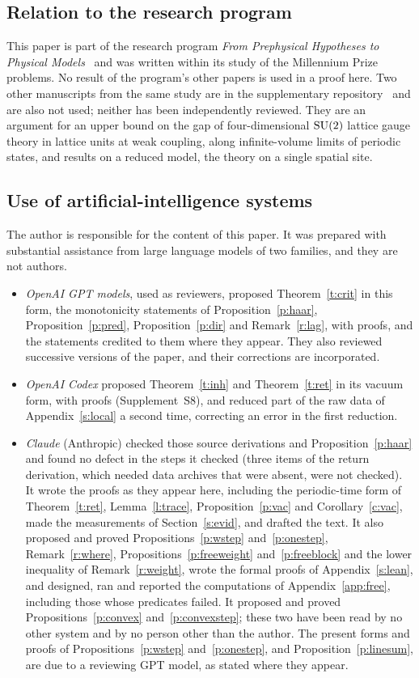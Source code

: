 \subsection*{Relation to the research program}
This paper is part of the research program \emph{From Prephysical Hypotheses to Physical
Models}~\cite{Prog} and was written within its study of the Millennium Prize problems. No result of the
program's other papers is used in a proof here. Two other manuscripts from the same study are in the
supplementary repository~\cite{Supp} and are also not used; neither has been independently reviewed. They
are an argument for an upper bound on the gap of four-dimensional $\mathrm{SU}(2)$ lattice gauge theory in lattice
units at weak coupling, along infinite-volume limits of periodic states, and results on a reduced model, the
theory on a single spatial site.

\subsection*{Use of artificial-intelligence systems}
The author is responsible for the content of this paper. It was prepared with substantial assistance from
large language models of two families, and they are not authors.
\begin{itemize}
\item \emph{OpenAI GPT models}, used as reviewers, proposed Theorem~\ref{t:crit} in this form, the
monotonicity statements of Proposition~\ref{p:haar}, Proposition~\ref{p:pred}, Proposition~\ref{p:dir} and
Remark~\ref{r:lag}, with proofs, and the statements credited to them where they appear. They also reviewed successive versions of the paper, and their corrections are incorporated.
\item \emph{OpenAI Codex} proposed Theorem~\ref{t:inh} and Theorem~\ref{t:ret} in its vacuum form, with proofs
(Supplement~S8), and reduced part of the raw data of Appendix~\ref{s:local} a second time, correcting an error
in the first reduction.
\item \emph{Claude} (Anthropic) checked those source derivations and Proposition~\ref{p:haar} and found no
defect in the steps it checked (three items of the return derivation, which needed data archives that were
absent, were not checked). It wrote the proofs as they appear here, including the periodic-time form of
Theorem~\ref{t:ret}, Lemma~\ref{l:trace}, Proposition~\ref{p:vac} and Corollary~\ref{c:vac}, made the
measurements of Section~\ref{s:evid}, and drafted the text. It also proposed and proved
Propositions~\ref{p:wstep} and~\ref{p:onestep}, Remark~\ref{r:where}, Propositions~\ref{p:freeweight}
and~\ref{p:freeblock} and the lower inequality of Remark~\ref{r:weight}, wrote the formal proofs of
Appendix~\ref{s:lean}, and designed, ran and reported the computations of Appendix~\ref{app:free}, including
those whose predicates failed. It proposed and proved Propositions~\ref{p:convex} and~\ref{p:convexstep};
these two have been read by no other system and by no person other than the author. The present forms and proofs of Propositions~\ref{p:wstep}
and~\ref{p:onestep}, and Proposition~\ref{p:linesum}, are due to a reviewing GPT model, as stated where they
appear.
\end{itemize}

